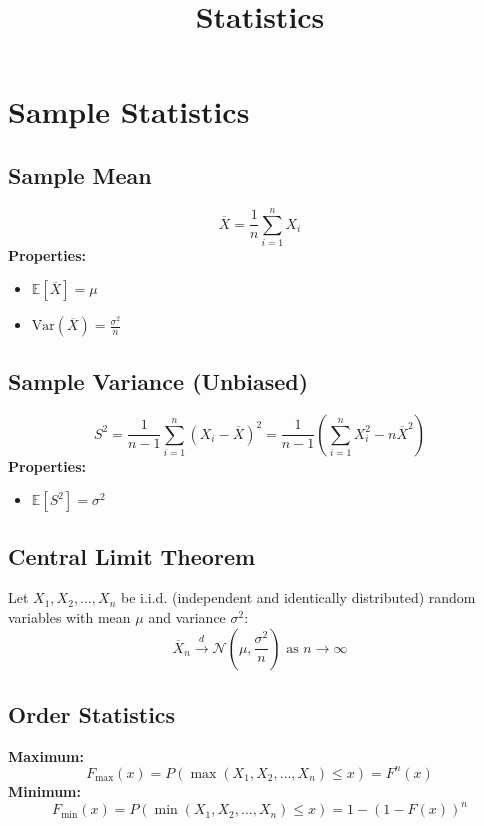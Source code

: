 \documentclass{article}
\title{Statistics}
\date{}
\begin{document}
\maketitle

\tableofcontents

\newpage
\section{Sample Statistics}

\subsection{Sample Mean}
\[
    \overline{X} = \frac{1}{n}\sum_{i=1}^{n} X_i
\]
\textbf{Properties:}
\begin{itemize}
    \item $\mathbb{E}[\overline{X}] = \mu$
    \item $\text{Var}(\overline{X}) = \frac{\sigma^2}{n}$
\end{itemize}

\subsection{Sample Variance (Unbiased)}
\[
    S^2 = \frac{1}{n-1}\sum_{i=1}^{n}(X_i - \overline{X})^2 = \frac{1}{n-1}\left(\sum_{i=1}^{n} X_i^2 - n\overline{X}^2\right)
\]
\textbf{Properties:}
\begin{itemize}
    \item $\mathbb{E}[S^2] = \sigma^2$
\end{itemize}

\subsection{Central Limit Theorem}

Let $X_1, X_2, \ldots, X_n$ be i.i.d. (independent and identically distributed) random variables with mean $\mu$ and variance $\sigma^2$:
\[
    \overline{X}_n \overset{d}{\rightarrow} \mathcal{N}\left(\mu, \frac{\sigma^2}{n}\right) \text{ as } n \rightarrow \infty
\]

\subsection{Order Statistics}

\textbf{Maximum:}
\[
    F_{\max}(x) = P\left(\max(X_1, X_2, \ldots, X_n) \leq x\right) = F^n(x)
\]
\textbf{Minimum:}
\[
    F_{\min}(x) = P\left(\min(X_1, X_2, \ldots, X_n) \leq x\right) = 1 - (1 - F(x))^n
\]
\end{document}
